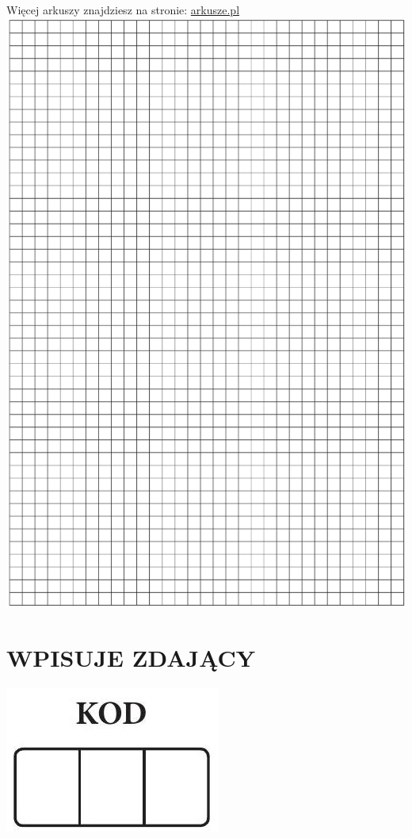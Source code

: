 \documentclass[10pt]{article}
\begin{document}
Więcej arkuszy znajdziesz na stronie: \href{http://arkusze.pl}{arkusze.pl}\\
\includegraphics[max width=\textwidth, center]{2024_11_21_dd21f7544b65bcf1b3c7g-22}

\section*{WPISUJE ZDAJĄCY}
\begin{center}
\includegraphics[max width=\textwidth]{2024_11_21_dd21f7544b65bcf1b3c7g-23}
\end{center}
\end{document}
